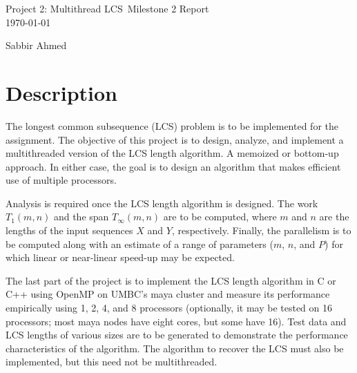 \documentclass[usletter, 11pt]{extarticle}
\newcommand{\project}{Project 2: Multithread LCS}
\newcommand{\members}{Sabbir Ahmed}
\begin{document}
    \begin{titlepage}

        \vspace*{\fill} %
        \begin{center}

            {\LARGE \project~Milestone 2 Report}\\ [1.5cm]

            \today

            \vspace*{\fill}

            \members

        \end{center}
        \vspace*{\fill} %

    \end{titlepage}

    \section{Description} The longest common subsequence (LCS) problem is to be
    implemented for the assignment. The objective of this project is to design,
    analyze, and implement a multithreaded version of the LCS length algorithm.
    A memoized or bottom-up approach. In either case, the goal is to design an
    algorithm that makes efficient use of multiple processors.

    Analysis is required once the LCS length algorithm is designed. The work
    $T_{1}(m, n)$ and the span $T_{\infty}(m, n)$ are to be computed, where $m$
    and $n$ are the lengths of the input sequences $X$ and $Y$, respectively.
    Finally, the parallelism is to be computed along with an estimate of a
    range of parameters ($m$, $n$, and $P$) for which linear or near-linear
    speed-up may be expected.

    The last part of the project is to implement the LCS length algorithm in C
    or C++ using OpenMP on UMBC's maya cluster and measure its performance
    empirically using 1, 2, 4, and 8 processors (optionally, it may be tested
    on 16 processors; most maya nodes have eight cores, but some have 16). Test
    data and LCS lengths of various sizes are to be generated to demonstrate
    the performance characteristics of the algorithm. The algorithm to recover
    the LCS must also be implemented, but this need not be multithreaded.
\end{document}
